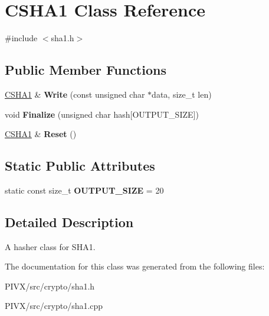 \hypertarget{class_c_s_h_a1}{}\section{C\+S\+H\+A1 Class Reference}
\label{class_c_s_h_a1}


{\ttfamily \#include $<$sha1.\+h$>$}

\subsection*{Public Member Functions}
\begin{DoxyCompactItemize}
\item 
\mbox{\label{class_c_s_h_a1_a4322be694ccb2d9864e0cd0c30496a8a}} 
\mbox{\hyperlink{class_c_s_h_a1}{C\+S\+H\+A1}} \& {\bfseries Write} (const unsigned char $\ast$data, size\+\_\+t len)
\item 
\mbox{\label{class_c_s_h_a1_a9a4f829cbe511ca899d27dcab1d0d9e6}} 
void {\bfseries Finalize} (unsigned char hash\mbox{[}O\+U\+T\+P\+U\+T\+\_\+\+S\+I\+ZE\mbox{]})
\item 
\mbox{\label{class_c_s_h_a1_ab7f3006a33ddccdc1f2b2f5da9cb90af}} 
\mbox{\hyperlink{class_c_s_h_a1}{C\+S\+H\+A1}} \& {\bfseries Reset} ()
\end{DoxyCompactItemize}
\subsection*{Static Public Attributes}
\begin{DoxyCompactItemize}
\item 
\mbox{\label{class_c_s_h_a1_a4dc144e60b3e32e7b2908096ecb413ef}} 
static const size\+\_\+t {\bfseries O\+U\+T\+P\+U\+T\+\_\+\+S\+I\+ZE} = 20
\end{DoxyCompactItemize}


\subsection{Detailed Description}
A hasher class for S\+H\+A1. 

The documentation for this class was generated from the following files\+:\begin{DoxyCompactItemize}
\item 
P\+I\+V\+X/src/crypto/sha1.\+h\item 
P\+I\+V\+X/src/crypto/sha1.\+cpp\end{DoxyCompactItemize}
